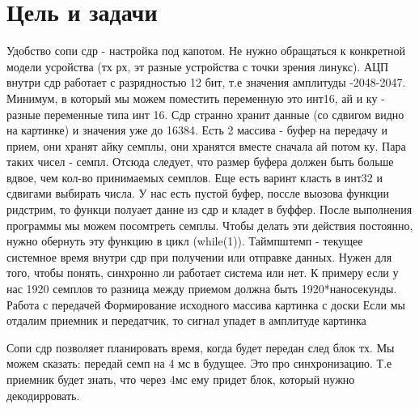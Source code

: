 \chapter{Цель и задачи}
\label{ch:intro}

Удобство сопи сдр - настройка под капотом. Не нужно обращаться к конкретной модели усройства (тх рх, эт разные устройства с точки 
зрения линукс). АЦП внутри сдр работает с разрядностью 12 бит, т.е значения амплитуды -2048-2047. Минимум, в который мы
можем поместить переменную это инт16, ай и ку - разные переменные типа инт 16. Сдр странно хранит данные (со сдвигом видно на 
картинке) и значения уже до 16384. Есть 2 массива - буфер на передачу и прием, они хранят айку семплы, они хранятся вместе 
сначала ай потом ку. Пара таких чисел - семпл. Отсюда следует, что размер буфера должен быть больше вдвое, чем кол-во 
принимаемых семплов. Еще есть варинт класть в инт32 и сдвигами выбирать числа. У нас есть пустой буфер, поссле выозова функции 
ридстрим, то функци полуает данне из сдр и кладет в буффер. После выполнения программы мы можем посомтреть семплы. Чтобы делать
эти действия постоянно, нужно обернуть эту функцию в цикл (while(1)). Таймпштемп - текущее системное время внутри сдр при получении
или отправке данных. Нужен для того, чтобы понять, синхронно ли работает система или нет. К примеру если у нас 1920 семплов
то разница между приемом должна быть 1920*наносекунды.
Работа с передачей
Формирование исходного массива
картинка с доски
Если мы отдалим приемник и передатчик, то сигнал упадет в амплитуде
картинка


Сопи сдр позволяет планировать время, когда будет передан след блок тх. Мы можем сказать: передай семп на 4 мс в будущее.
Это про синхронизацию. Т.е приемник будет знать, что через 4мс ему придет блок, который нужно декодирровать.

\endinput